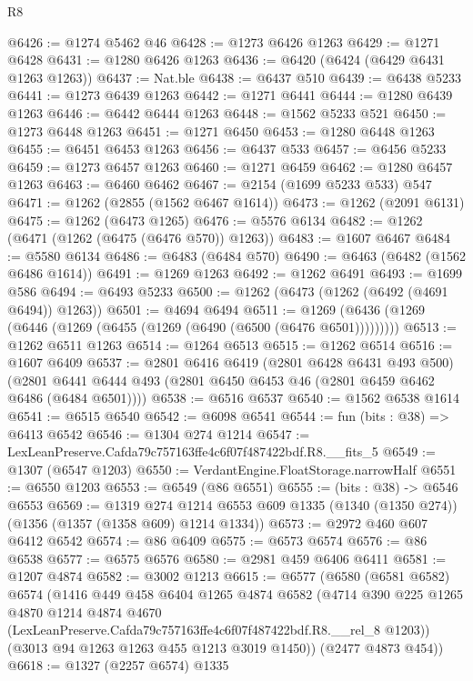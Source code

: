 \begin{lexlean}{R8}
\begin{coremodule}
@6426 := @1274 @5462 @46
@6428 := @1273 @6426 @1263
@6429 := @1271 @6428
@6431 := @1280 @6426 @1263
@6436 := @6420 (@6424 (@6429 @6431 @1263 @1263))
@6437 := Nat.ble
@6438 := @6437 @510
@6439 := @6438 @5233
@6441 := @1273 @6439 @1263
@6442 := @1271 @6441
@6444 := @1280 @6439 @1263
@6446 := @6442 @6444 @1263
@6448 := @1562 @5233 @521
@6450 := @1273 @6448 @1263
@6451 := @1271 @6450
@6453 := @1280 @6448 @1263
@6455 := @6451 @6453 @1263
@6456 := @6437 @533
@6457 := @6456 @5233
@6459 := @1273 @6457 @1263
@6460 := @1271 @6459
@6462 := @1280 @6457 @1263
@6463 := @6460 @6462
@6467 := @2154 (@1699 @5233 @533) @547
@6471 := @1262 (@2855 (@1562 @6467 @1614))
@6473 := @1262 (@2091 @6131)
@6475 := @1262 (@6473 @1265)
@6476 := @5576 @6134
@6482 := @1262 (@6471 (@1262 (@6475 (@6476 @570)) @1263))
@6483 := @1607 @6467
@6484 := @5580 @6134
@6486 := @6483 (@6484 @570)
@6490 := @6463 (@6482 (@1562 @6486 @1614))
@6491 := @1269 @1263
@6492 := @1262 @6491
@6493 := @1699 @586
@6494 := @6493 @5233
@6500 := @1262 (@6473 (@1262 (@6492 (@4691 @6494)) @1263))
@6501 := @4694 @6494
@6511 := @1269 (@6436 (@1269 (@6446 (@1269 (@6455 (@1269 (@6490 (@6500 (@6476 @6501)))))))))
@6513 := @1262 @6511 @1263
@6514 := @1264 @6513
@6515 := @1262 @6514
@6516 := @1607 @6409
@6537 := @2801
    @6416
    @6419
    (@2801 @6428 @6431 @493 @500)
    (@2801 @6441 @6444 @493 (@2801 @6450 @6453 @46 (@2801 @6459 @6462 @6486 (@6484 @6501))))
@6538 := @6516 @6537
@6540 := @1562 @6538 @1614
@6541 := @6515 @6540
@6542 := @6098 @6541
@6544 := fun (bits : @38) => @6413 @6542
@6546 := @1304 @274 @1214
@6547 := LexLeanPreserve.Cafda79c757163ffe4c6f07f487422bdf.R8.__fits_5
@6549 := @1307 (@6547 @1203)
@6550 := VerdantEngine.FloatStorage.narrowHalf
@6551 := @6550 @1203
@6553 := @6549 (@86 @6551)
@6555 := (bits : @38) -> @6546 @6553
@6569 := @1319
    @274
    @1214
    @6553
    @609
    @1335
    (@1340 (@1350 @274))
    (@1356 (@1357 (@1358 @609) @1214 @1334))
@6573 := @2972 @460 @607 @6412 @6542
@6574 := @86 @6409
@6575 := @6573 @6574
@6576 := @86 @6538
@6577 := @6575 @6576
@6580 := @2981 @459 @6406 @6411
@6581 := @1207 @4874
@6582 := @3002 @1213
@6615 := @6577
    (@6580
      (@6581 @6582)
      @6574
      (@1416
        @449
        @458
        @6404
        @1265
        @4874
        @6582
        (@4714
          @390
          @225
          @1265
          @4870
          @1214
          @4874
          @4670
          (LexLeanPreserve.Cafda79c757163ffe4c6f07f487422bdf.R8.__rel_8 @1203))
        (@3013 @94 @1263 @1263 @455 @1213 @3019 @1450))
      (@2477 @4873 @454))
@6618 := @1327 (@2257 @6574) @1335

\end{coremodule}
\end{lexlean}
